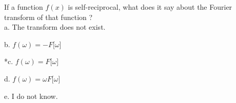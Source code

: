 
If a function $f(x)$ is self-reciprocal, what does it say about the
Fourier transform of that function ? \\

a. The transform does not exist.

b. $f(\omega) = -F\lbrack\omega\rbrack$

*c. $f(\omega) = F\lbrack\omega\rbrack$

d. $f(\omega) = \omega F\lbrack\omega\rbrack$

e. I do not know. \\
